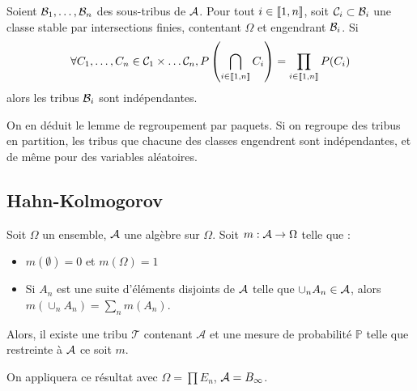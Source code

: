 \documentclass{cours}
\begin{document}
            \begin{proposition}
                Soient $\mathcal{B}_{1}, \ldots, \mathcal{B}_{n}$ des sous-tribus de $\mathcal{A}$. Pour tout $i\in \left\llbracket 1, n\right\rrbracket$, soit $\mathcal{C}_{i} \subset \mathcal{B}_{i}$ une classe stable par intersections finies, contentant $\Omega$ et engendrant $\mathcal{B}_{i}$. Si 
                \[
                    \forall C_{1}, \ldots, C_{n} \in \mathcal{C}_{1} \times \ldots \mathcal{C}_{n}, P\left(\bigcap_{i \in \left\llbracket 1, n\right\rrbracket} C_{i}\right) = \prod_{i \in \left\llbracket 1, n\right\rrbracket}P(C_{i})
                \]
                alors les tribus $\mathcal{B}_{i}$ sont indépendantes.
            \end{proposition}
            \begin{corollary}
                On en déduit le lemme de regroupement par paquets. Si on regroupe des tribus en partition, les tribus que chacune des classes engendrent sont indépendantes, et de même pour des variables aléatoires. 
            \end{corollary}
            

        \subsection{Hahn-Kolmogorov}
            \begin{theorem}
                Soit $\Omega$ un ensemble, $\mathcal{A}$ une algèbre sur $\Omega$.
                Soit $m : \mathcal{A} \rightarrow \Omega$ telle que : 
                \begin{itemize}
                    \item $m(\emptyset) = 0$ et $m(\Omega) = 1$
                    \item Si $A_{n}$ est une suite d'éléments disjoints de $\mathcal{A}$ telle que $\cup_{n} A_{n} \in \mathcal{A}$, alors $m\left(\cup_{n} A_{n}\right) = \sum_{n} m(A_{n})$.
                \end{itemize}
                Alors, il existe une tribu $\mathcal{T}$ contenant $\mathcal{A}$ et une mesure de probabilité $\mathbb{P}$ telle que restreinte à $\mathcal{A}$ ce soit $m$.
            \end{theorem}
            \begin{remark}
                On appliquera ce résultat avec $\Omega = \prod E_{n}$, $\mathcal{A} = B_{\infty}$.
            \end{remark}
\end{document}
